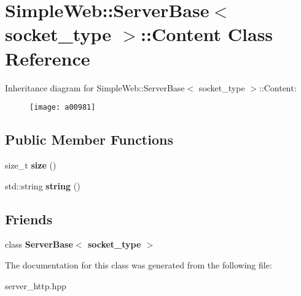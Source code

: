 \hypertarget{a00981}{}\section{Simple\+Web\+:\+:Server\+Base$<$ socket\+\_\+type $>$\+:\+:Content Class Reference}
\label{a00981}
Inheritance diagram for Simple\+Web\+:\+:Server\+Base$<$ socket\+\_\+type $>$\+:\+:Content\+:\begin{figure}[H]
\begin{center}
\leavevmode
\texttt{[image: a00981]}
\end{center}
\end{figure}
\subsection*{Public Member Functions}
\begin{DoxyCompactItemize}
\item 
\mbox{\label{a00981_adf8b2386c8ab32277341c6ae07cd4670}} 
size\+\_\+t {\bfseries size} ()
\item 
\mbox{\label{a00981_a6b4a72b0631c88ef576db28f54a768cb}} 
std\+::string {\bfseries string} ()
\end{DoxyCompactItemize}
\subsection*{Friends}
\begin{DoxyCompactItemize}
\item 
\mbox{\label{a00981_a01d54a7e16ca437c98ec571deca98dfc}} 
class {\bfseries Server\+Base$<$ socket\+\_\+type $>$}
\end{DoxyCompactItemize}


The documentation for this class was generated from the following file\+:\begin{DoxyCompactItemize}
\item 
server\+\_\+http.\+hpp\end{DoxyCompactItemize}
